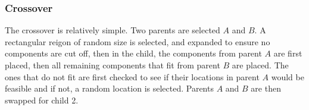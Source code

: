 \documentclass{article}
\begin{document}
\subsubsection{Crossover}
The crossover is relatively simple. Two parents are selected $A$ and $B$. A rectangular reigon of random size is selected, and expanded to ensure no components are cut off, then in the child, the components from parent $A$ are first placed, then all remaining components that fit from parent $B$ are placed. The ones that do not fit are first checked to see if their locations in parent $A$ would be feasible and if not, a random location is selected. Parents $A$ and $B$ are then swapped for child 2.
\begin{figure}[ht]
\centering
{}
\end{figure}
\end{document}

